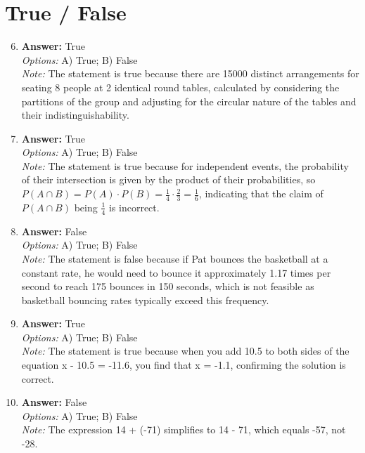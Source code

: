 \documentclass[12pt]{article}
\begin{document}
\section*{True / False}
\begin{enumerate}[label=\arabic*.]
\setcounter{enumi}{5}
\item \textbf{Answer:} True
\\ \textit{Options:} A) True; B) False
\\ \textit{Note:} The statement is true because there are 15000 distinct arrangements for seating 8 people at 2 identical round tables, calculated by considering the partitions of the group and adjusting for the circular nature of the tables and their indistinguishability.
\item \textbf{Answer:} True
\\ \textit{Options:} A) True; B) False
\\ \textit{Note:} The statement is true because for independent events, the probability of their intersection is given by the product of their probabilities, so \( P(A \cap B) = P(A) \cdot P(B) = \frac{1}{4} \cdot \frac{2}{3} = \frac{1}{6} \), indicating that the claim of \( P(A \cap B) \) being \( \frac{1}{4} \) is incorrect.
\item \textbf{Answer:} False
\\ \textit{Options:} A) True; B) False
\\ \textit{Note:} The statement is false because if Pat bounces the basketball at a constant rate, he would need to bounce it approximately 1.17 times per second to reach 175 bounces in 150 seconds, which is not feasible as basketball bouncing rates typically exceed this frequency.
\item \textbf{Answer:} True
\\ \textit{Options:} A) True; B) False
\\ \textit{Note:} The statement is true because when you add 10.5 to both sides of the equation x - 10.5 = -11.6, you find that x = -1.1, confirming the solution is correct.
\item \textbf{Answer:} False
\\ \textit{Options:} A) True; B) False
\\ \textit{Note:} The expression 14 + (-71) simplifies to 14 - 71, which equals -57, not -28.
\end{enumerate}
\end{document}
